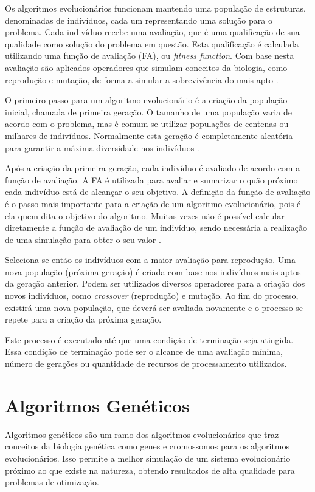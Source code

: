 \documentclass[12pt,oneside,a4paper,english,french,spanish,brazil,]{abntex2}
\begin{document}
Os algoritmos evolucionários funcionam mantendo uma população de estruturas, denominadas de indivíduos, cada um representando uma solução para o problema. Cada indivíduo recebe uma avaliação, que é uma qualificação de sua qualidade como solução do problema em questão. Esta qualificação é calculada utilizando uma função de avaliação (FA), ou \textit{fitness function}. Com base nesta avaliação são aplicados operadores que simulam conceitos da biologia, como reprodução e mutação, de forma a simular a sobrevivência do mais apto \cite{linden:2008}.

O primeiro passo para um algoritmo evolucionário é a criação da população inicial, chamada de primeira geração. O tamanho de uma população varia de acordo com o problema, mas é comum se utilizar populações de centenas ou milhares de indivíduos. Normalmente esta geração é completamente aleatória para garantir a máxima diversidade nos indivíduos \cite{linden:2008}.

Após a criação da primeira geração, cada indivíduo é avaliado de acordo com a função de avaliação. A FA é utilizada para avaliar e sumarizar o quão próximo cada indivíduo está de alcançar o seu objetivo. A definição da função de avaliação é o passo mais importante para a criação de um algoritmo evolucionário, pois é ela quem dita o objetivo do algoritmo. Muitas vezes não é possível calcular diretamente a função de avaliação de um indivíduo, sendo necessária a realização de uma simulação para obter o seu valor \cite{linden:2008}.

Seleciona-se então os indivíduos com a maior avaliação para reprodução. Uma nova população (próxima geração) é criada com base nos indivíduos mais aptos da geração anterior. Podem ser utilizados diversos operadores para a criação dos novos indivíduos, como \textit{crossover} (reprodução) e mutação. Ao fim do processo, existirá uma nova população, que deverá ser avaliada novamente e o processo se repete para a criação da próxima geração.

Este processo é executado até que uma condição de terminação seja atingida. Essa condição de terminação pode ser o alcance de uma avaliação mínima, número de gerações ou quantidade de recursos de processamento utilizados.

\section{Algoritmos Genéticos}

Algoritmos genéticos são um ramo dos algoritmos evolucionários que traz conceitos da biologia genética como genes e cromossomos para os algoritmos evolucionários. Isso permite a melhor simulação de um sistema evolucionário próximo ao que existe na natureza, obtendo resultados de alta qualidade para problemas de otimização.
\end{document}
